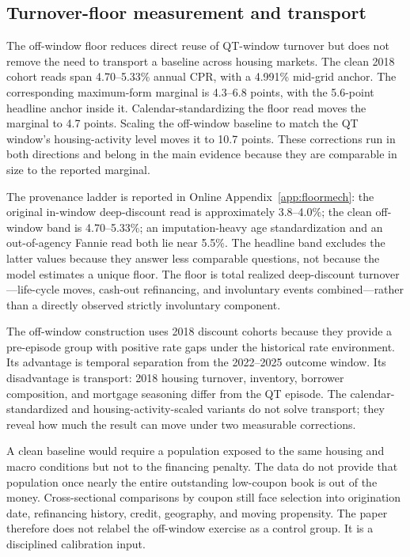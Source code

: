 \subsection{Turnover-floor measurement and transport}

The off-window floor reduces direct reuse of QT-window turnover but does not remove the need to transport a baseline across housing markets. The clean 2018 cohort reads span 4.70--5.33\% annual CPR, with a 4.991\% mid-grid anchor. The corresponding maximum-form marginal is 4.3--6.8 points, with the 5.6-point headline anchor inside it. Calendar-standardizing the floor read moves the marginal to 4.7 points. Scaling the off-window baseline to match the QT window's housing-activity level moves it to 10.7 points. These corrections run in both directions and belong in the main evidence because they are comparable in size to the reported marginal.

The provenance ladder is reported in Online Appendix~\ref{app:floormech}: the original in-window deep-discount read is approximately 3.8--4.0\%; the clean off-window band is 4.70--5.33\%; an imputation-heavy age standardization and an out-of-agency Fannie read both lie near 5.5\%. The headline band excludes the latter values because they answer less comparable questions, not because the model estimates a unique floor. The floor is total realized deep-discount turnover---life-cycle moves, cash-out refinancing, and involuntary events combined---rather than a directly observed strictly involuntary component.

The off-window construction uses 2018 discount cohorts because they provide a pre-episode group with positive rate gaps under the historical rate environment. Its advantage is temporal separation from the 2022--2025 outcome window. Its disadvantage is transport: 2018 housing turnover, inventory, borrower composition, and mortgage seasoning differ from the QT episode. The calendar-standardized and housing-activity-scaled variants do not solve transport; they reveal how much the result can move under two measurable corrections.

A clean baseline would require a population exposed to the same housing and macro conditions but not to the financing penalty. The data do not provide that population once nearly the entire outstanding low-coupon book is out of the money. Cross-sectional comparisons by coupon still face selection into origination date, refinancing history, credit, geography, and moving propensity. The paper therefore does not relabel the off-window exercise as a control group. It is a disciplined calibration input.

